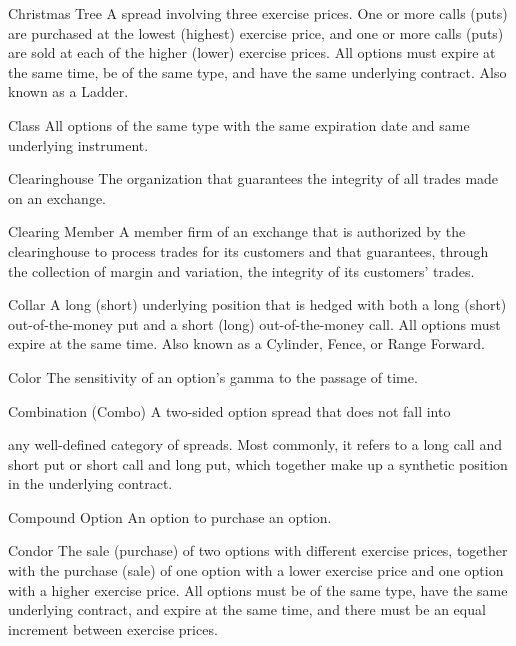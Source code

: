 Christmas Tree A spread involving three exercise prices. One or more calls (puts) are purchased at the lowest (highest) exercise price, and one or more calls (puts) are sold at each of the higher (lower) exercise prices. All options must expire at the same time, be of the same type, and have the same underlying contract. Also known as a Ladder.\par
Class All options of the same type with the same expiration date and same underlying instrument.\par
Clearinghouse The organization that guarantees the integrity of all trades made on an exchange.\par
Clearing Member A member firm of an exchange that is authorized by the clearinghouse to process trades for its customers and that guarantees, through the collection of margin and variation, the integrity of its customers' trades.\par
Collar A long (short) underlying position that is hedged with both a long (short) out-of-the-money put and a short (long) out-of-the-money call. All options must expire at the same time. Also known as a Cylinder, Fence, or Range Forward.\par
Color The sensitivity of an option's gamma to the passage of time.\par
Combination (Combo) A two-sided option spread that does not fall into\par
any well-defined category of spreads. Most commonly, it refers to a long call and short put or short call and long put, which together make up a synthetic position in the underlying contract.\par
Compound Option An option to purchase an option.\par
Condor The sale (purchase) of two options with different exercise prices, together with the purchase (sale) of one option with a lower exercise price and one option with a higher exercise price. All options must be of the same type, have the same underlying contract, and expire at the same time, and there must be an equal increment between exercise prices.\par

